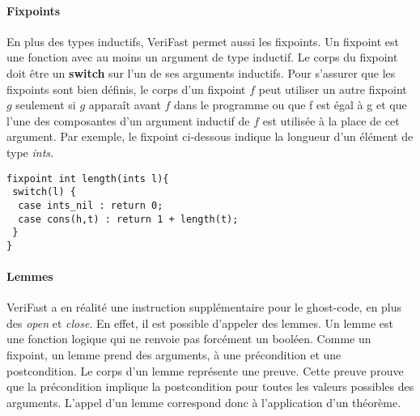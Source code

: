 \documentclass[11pt,openany]{article}
\newcommand{\verifast}{VeriFast}
\begin{document}
			\paragraph{Fixpoints}
				En plus des types inductifs, \verifast{} permet aussi les fixpoints. Un fixpoint est une fonction avec au moins un argument de type inductif. Le corps du fixpoint doit \^etre un \textbf{switch} sur l'un de ses arguments inductifs. Pour s'assurer que les fixpoints sont bien d\'efinis, le corps d'un fixpoint $f$ peut utiliser un autre fixpoint $g$ seulement si $g$ appara\^it avant $f$ dans le programme ou que f est \'egal \`a g et que l'une des composantes d'un argument inductif de $f$ est utilis\'ee \`a la place de cet argument. Par exemple, le fixpoint ci-dessous indique la longueur d'un \'el\'ement de type \textit{ints}.
			\begin{lstlisting}
fixpoint int length(ints l){
 switch(l) {
  case ints_nil : return 0;
  case cons(h,t) : return 1 + length(t);
 }
}
			\end{lstlisting}
			\paragraph{Lemmes}
			\verifast{} a en r\'ealit\'e une instruction suppl\'ementaire pour le ghost-code, en plus des \textit{open} et \textit{close}. En effet, il est possible d'appeler des lemmes. Un lemme est une fonction logique qui ne renvoie pas forc\'ement un bool\'een. Comme un fixpoint, un lemme prend des arguments, \`a une pr\'econdition et une postcondition. Le corps d'un lemme repr\'esente une preuve. Cette preuve prouve que la pr\'econdition implique la postcondition pour toutes les valeurs possibles des arguments. L'appel d'un lemme correspond donc \`a l'application d'un th\'eor\`eme.
			
\end{document}

